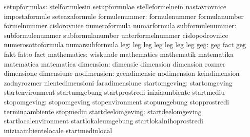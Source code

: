                    setupformulas: stelformulesin                   setupformulae
                                  stelleformelnein                 nastavrovnice
                                  impostaformule                   seteazaformule
                   formulenummer: formulenummer                    formulanumber
                                  formelnummer                     cislorovnice
                                  numeroformula                    numarformula
                subformulenummer: subformulenummer                 subformulanumber
                                  unterformelnummer                cislopodrovnice
                                  numerosottoformula               numarsubformula
                             leg: leg                              leg
                                  leg                              leg
                                  leg                              leg
                             geg: geg                              fact
                                  geg                              fakt
                                  fatto                            fact
                     mathematics: wiskunde                         mathematics
                                  mathematik                       matematika
                                  matematica                       matematica
                       dimension: dimensie                         dimension
                                  dimension                        rozmer
                                  dimensione                       dimensiune
                     nodimension: geendimensie                     nodimension
                                  keindimension                    zadnyrozmer
                                  nientedimensioni                 faradimensiune
                   startomgeving: startomgeving                    startenvironment
                                  startumgebung                    startprostredi
                                  iniziaambiente                   startmediu
                    stopomgeving: stopomgeving                     stopenvironment
                                  stopumgebung                     stopprostredi
                                  terminaambiente                  stopmediu
               startdeelomgeving: startdeelomgeving                startlocalenvironment
                                  startlokaleumgebung              startlokalnihoprostredi
                                  iniziaambientelocale             startmediulocal
